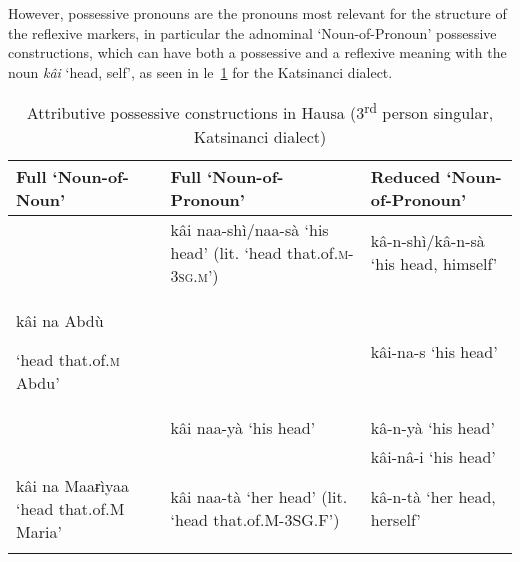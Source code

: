 \documentclass[output=paper]{langscibook}
\begin{document}
However, possessive pronouns are the pronouns most relevant for the structure of the reflexive markers, in particular the adnominal ‘Noun-of-Pronoun’ possessive constructions, which can have both a possessive and a reflexive meaning with the noun \textit{kâi} ‘head, self’, as seen in le~\ref{tab:Abdoulaye:2} for the Katsinanci dialect.

\begin{table}[ht]
    \begin{tabularx}{0.95\textwidth}{p{3.5cm}p{4.5cm}p{3cm}}
    \lsptoprule
   Full ‘Noun-of-Noun’ & Full ‘Noun-of-Pronoun’ & Reduced ‘Noun-of-Pronoun’\\
   \hline 
    & kâi naa-shì/naa-sà  ‘his head’ (lit. ‘head that.of.\textsc{m-3sg.m}’) & kâ-n-shì/kâ-n-sà ‘his head, himself’\\ 
   \cmidrule{3-3}
  kâi na Abdù 
  
  ‘head that.of.\textsc{m} Abdu’ & & kâi-na-s ‘his head’\\
   \cmidrule{2-3}
   & kâi naa-yà ‘his head’ & kâ-n-yà ‘his head’\\
   \cmidrule{3-3}
   & & kâi-nâ-i ‘his head’\\
   \cmidrule{1-3}
   kâi na Maaɍìyaa ‘head that.of.M Maria’ & kâi naa-tà ‘her head’ (lit. ‘head that.of.M-3SG.F’) & kâ-n-tà ‘her head, herself’\\

	


    \lspbottomrule
    \end{tabularx}
    \caption{Attributive possessive constructions in Hausa (3\textsuperscript{rd} person singular, Katsinanci dialect)}
    \label{tab:Abdoulaye:2}
\end{table}
\end{document}
